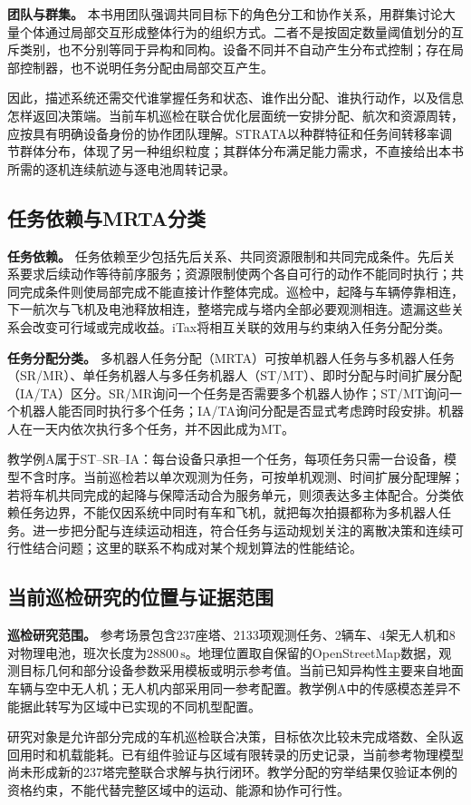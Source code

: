 \textbf{团队与群集。}
本书用团队强调共同目标下的角色分工和协作关系，用群集讨论大量个体通过局部交互形成整体行为的组织方式。二者不是按固定数量阈值划分的互斥类别，也不分别等同于异构和同构。设备不同并不自动产生分布式控制；存在局部控制器，也不说明任务分配由局部交互产生。

因此，描述系统还需交代谁掌握任务和状态、谁作出分配、谁执行动作，以及信息怎样返回决策端。当前车机巡检在联合优化层面统一安排分配、航次和资源周转，应按具有明确设备身份的协作团队理解。STRATA以种群特征和任务间转移率调节群体分布\cite{STRATA2020}，体现了另一种组织粒度；其群体分布满足能力需求，不直接给出本书所需的逐机连续航迹与逐电池周转记录。

\subsection{任务依赖与MRTA分类}

\textbf{任务依赖。}
任务依赖至少包括先后关系、共同资源限制和共同完成条件。先后关系要求后续动作等待前序服务；资源限制使两个各自可行的动作不能同时执行；共同完成条件则使局部完成不能直接计作整体完成。巡检中，起降与车辆停靠相连，下一航次与飞机及电池释放相连，整塔完成与塔内全部必要观测相连。遗漏这些关系会改变可行域或完成收益。iTax将相互关联的效用与约束纳入任务分配分类\cite{Korsah2013}。

\textbf{任务分配分类。}
多机器人任务分配（MRTA）可按单机器人任务与多机器人任务（SR/MR）、单任务机器人与多任务机器人（ST/MT）、即时分配与时间扩展分配（IA/TA）区分\cite{STRATA2020}。SR/MR询问一个任务是否需要多个机器人协作；ST/MT询问一个机器人能否同时执行多个任务；IA/TA询问分配是否显式考虑跨时段安排。机器人在一天内依次执行多个任务，并不因此成为MT。

教学例A属于ST--SR--IA：每台设备只承担一个任务，每项任务只需一台设备，模型不含时序。当前巡检若以单次观测为任务，可按单机观测、时间扩展分配理解；若将车机共同完成的起降与保障活动合为服务单元，则须表达多主体配合。分类依赖任务边界，不能仅因系统中同时有车和飞机，就把每次拍摄都称为多机器人任务。进一步把分配与连续运动相连，符合任务与运动规划关注的离散决策和连续可行性结合问题\cite{TAMP2021}；这里的联系不构成对某个规划算法的性能结论。

\subsection{当前巡检研究的位置与证据范围}

\textbf{巡检研究范围。}
参考场景包含237座塔、2133项观测任务、2辆车、4架无人机和8对物理电池，班次长度为$28800\,\mathrm{s}$。地理位置取自保留的OpenStreetMap数据\cite{OSMData}，观测目标几何和部分设备参数采用模板或明示参考值。当前已知异构性主要来自地面车辆与空中无人机；无人机内部采用同一参考配置。教学例A中的传感模态差异不能据此转写为区域中已实现的不同机型配置。

研究对象是允许部分完成的车机巡检联合决策，目标依次比较未完成塔数、全队返回用时和机载能耗。已有组件验证与区域有限转录的历史记录，当前参考物理模型尚未形成新的237塔完整联合求解与执行闭环。教学分配的穷举结果仅验证本例的资格约束，不能代替完整区域中的运动、能源和协作可行性。
